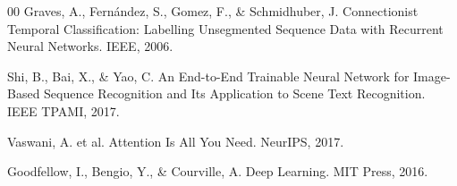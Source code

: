 \documentclass[conference]{IEEEtran}
\begin{document}
\begin{thebibliography}{00}
 Graves, A., Fernández, S., Gomez, F., \& Schmidhuber, J. Connectionist Temporal Classification: Labelling Unsegmented Sequence Data with Recurrent Neural Networks. IEEE, 2006.

 Shi, B., Bai, X., \& Yao, C. An End-to-End Trainable Neural Network for Image-Based Sequence Recognition and Its Application to Scene Text Recognition. IEEE TPAMI, 2017.

 Vaswani, A. et al. Attention Is All You Need. NeurIPS, 2017.

 Goodfellow, I., Bengio, Y., \& Courville, A. Deep Learning. MIT Press, 2016.

\end{thebibliography}
\end{document}
